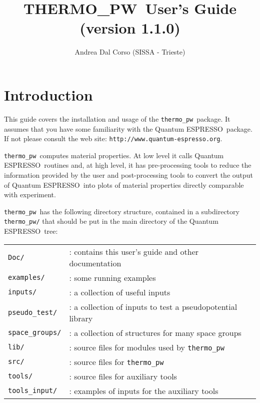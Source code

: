 \documentclass[12pt,a4paper]{article}
\def\version{1.1.0}
\def\qe{{\sc Quantum ESPRESSO}}
\def\tpw{{\sc THERMO\_PW}}
\def\thermo{\texttt{thermo\_pw}}
\begin{document}
 
\author{Andrea Dal Corso (SISSA - Trieste)}
\date{}


\title{
  \vskip 1cm
  {\color{red} \Huge \tpw\ User's Guide} \\
  \Large (version \version)
}

\maketitle

\tableofcontents

\newpage

\section{\color{coral}Introduction}

This guide covers the installation and usage of the \thermo\ package. 
It assumes that you have some familiarity with the \qe\ package. 
If not please consult the web site: \texttt{http://www.quantum-espresso.org}.

\thermo\ computes material properties.
At low level it calls \qe\ routines and, at high level, it has pre-processing
tools to reduce the information provided by the user and
post-processing tools to convert the output of \qe\ into plots of material 
properties directly comparable with experiment. 

\thermo\ has the following directory structure, contained in a subdirectory 
\texttt{thermo\_pw/} that should be put in the main directory of the \qe\ tree:

\begin{tabular}{ll}
\texttt{Doc/}      & : contains this user's guide and other documentation\\
\texttt{examples/} & : some running examples \\
\texttt{inputs/}   & : a collection of useful inputs \\
\texttt{pseudo\_test/} & : a collection of inputs to test a pseudopotential library\\
\texttt{space\_groups/} & : a collection of structures for many space groups \\
\texttt{lib/}      & : source files for modules used by \thermo\ \\
\texttt{src/}      & : source files for \thermo\ \\
\texttt{tools/}    & : source files for auxiliary tools \\
\texttt{tools\_input/}  & : examples of inputs for the auxiliary tools \\
\end{tabular}\\
\end{document}

